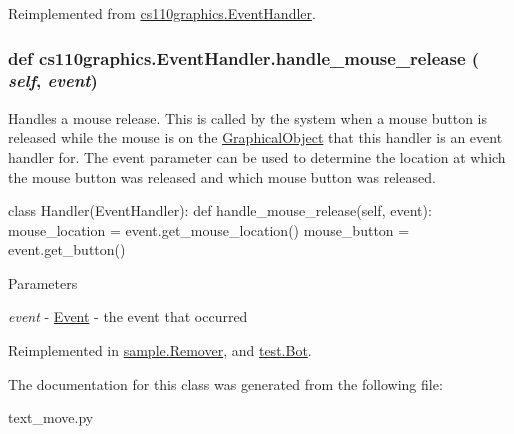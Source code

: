 Reimplemented from \hyperlink{classcs110graphics_1_1EventHandler_a547873123ebcd3fcc63a2e03d2a2fee3}{cs110graphics.EventHandler}.\hypertarget{classcs110graphics_1_1EventHandler_a320a7dbf68d37e0101b237bff1713088}{
\subsubsection[{handle\_\-mouse\_\-release}]{\setlength{\rightskip}{0pt plus 5cm}def cs110graphics.EventHandler.handle\_\-mouse\_\-release ( {\em self}, \/   {\em event})}}
\label{classcs110graphics_1_1EventHandler_a320a7dbf68d37e0101b237bff1713088}


Handles a mouse release. This is called by the system when a mouse button is released while the mouse is on the \hyperlink{classcs110graphics_1_1GraphicalObject}{GraphicalObject} that this handler is an event handler for. The event parameter can be used to determine the location at which the mouse button was released and which mouse button was released. 
\begin{DoxyCode}
 class Handler(EventHandler):
     def handle_mouse_release(self, event):
         mouse_location = event.get_mouse_location()
         mouse_button = event.get_button()
\end{DoxyCode}
 
\begin{DoxyParams}{Parameters}
\item[{\em event}]-\/ \hyperlink{classcs110graphics_1_1Event}{Event} -\/ the event that occurred \end{DoxyParams}


Reimplemented in \hyperlink{classsample_1_1Remover_a84484de500f08402e582c126432e0cf1}{sample.Remover}, and \hyperlink{classtest_1_1Bot_a18fc05b6e2c1e42e1b6c639f4844a059}{test.Bot}.

The documentation for this class was generated from the following file:\begin{DoxyCompactItemize}
\item 
text\_\-move.py\end{DoxyCompactItemize}
